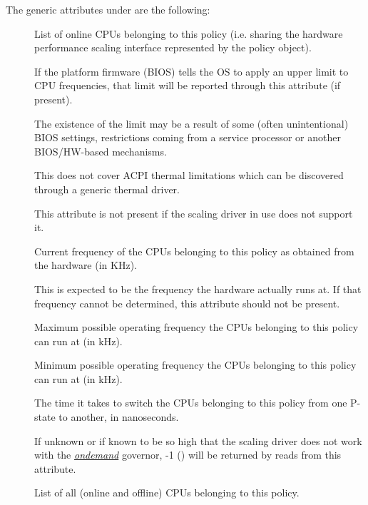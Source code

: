 \documentclass[a4paper,8pt,english]{sphinxmanual}
\begin{document}
The generic attributes under 
are the following:
\begin{description}
\item[{}] \leavevmode
List of online CPUs belonging to this policy (i.e. sharing the hardware
performance scaling interface represented by the  policy
object).

\item[{}] \leavevmode
If the platform firmware (BIOS) tells the OS to apply an upper limit to
CPU frequencies, that limit will be reported through this attribute (if
present).

The existence of the limit may be a result of some (often unintentional)
BIOS settings, restrictions coming from a service processor or another
BIOS/HW-based mechanisms.

This does not cover ACPI thermal limitations which can be discovered
through a generic thermal driver.

This attribute is not present if the scaling driver in use does not
support it.

\item[{}] \leavevmode
Current frequency of the CPUs belonging to this policy as obtained from
the hardware (in KHz).

This is expected to be the frequency the hardware actually runs at.
If that frequency cannot be determined, this attribute should not
be present.

\item[{}] \leavevmode
Maximum possible operating frequency the CPUs belonging to this policy
can run at (in kHz).

\item[{}] \leavevmode
Minimum possible operating frequency the CPUs belonging to this policy
can run at (in kHz).

\item[{}] \leavevmode
The time it takes to switch the CPUs belonging to this policy from one
P-state to another, in nanoseconds.

If unknown or if known to be so high that the scaling driver does not
work with the {\hyperref[admin\string-guide/pm/cpufreq:ondemand]{\emph{ondemand}}} governor, -1 ()
will be returned by reads from this attribute.

\item[{}] \leavevmode
List of all (online and offline) CPUs belonging to this policy.


\end{description}
\end{document}
